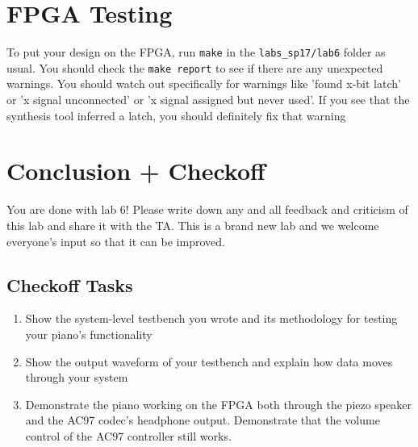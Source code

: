 \documentclass[11pt]{article}
\begin{document}
\section{FPGA Testing}
To put your design on the FPGA, run \verb|make| in the \verb|labs_sp17/lab6| folder as usual. You should check the \verb|make report| to see if there are any unexpected warnings. You should watch out specifically for warnings like 'found x-bit latch' or 'x signal unconnected' or 'x signal assigned but never used'. If you see that the synthesis tool inferred a latch, you should definitely fix that warning


\section{Conclusion + Checkoff}
You are done with lab 6! Please write down any and all feedback and criticism of this lab and share it with the TA. This is a brand new lab and we welcome everyone's input so that it can be improved.


\subsection{Checkoff Tasks}
\begin{enumerate}
	\item Show the system-level testbench you wrote and its methodology for testing your piano's functionality
	\item Show the output waveform of your testbench and explain how data moves through your system
	\item Demonstrate the piano working on the FPGA both through the piezo speaker and the AC97 codec's headphone output. Demonstrate that the volume control of the AC97 controller still works.
\end{enumerate}
\end{document}

